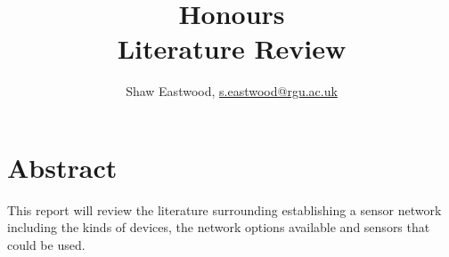 \documentclass{article}
\title{Honours \\ Literature Review}
\author{Shaw Eastwood, \url{s.eastwood@rgu.ac.uk}}
\begin{document}
	\maketitle
	
	\section{Abstract}
	This report will review the literature surrounding establishing a sensor network including the kinds of devices, the network options available and sensors that could be used.
	
	
	
	
	
	
	
	
	
	
\end{document}
